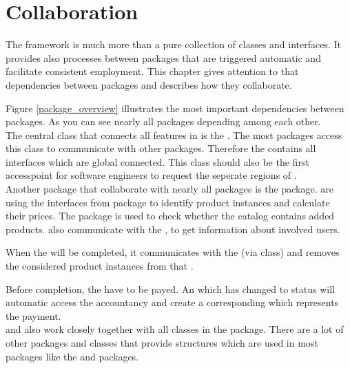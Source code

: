 \chapter{Collaboration}

The \salespoint{} framework is much more than a pure collection of classes and interfaces. It provides also processes between packages that are triggered automatic and facilitate consistent employment. This chapter gives attention to that dependencies between packages and describes how they collaborate.  

Figure \ref{package_overview} illustrates the most important dependencies between \salespoint{} packages. As you can see nearly all packages depending among each other.\\ 

The central class that connects all features in \salespoint{} is the . The most packages access this class to communicate with other packages. Therefore the  contains all interfaces which are global connected. This class should also be the first accesspoint for software engineers to request the seperate regions of \salespoint{}.\\

Another package that collaborate with nearly all packages is the  package.  are using the interfaces from  package to identify product instances and calculate their prices. The  package is used to check whether the catalog contains added products.  also communicate with the , to get information about involved users.\par 
When the  will be completed, it communicates with the  (via  class) and removes the considered product instances from that . \par
Before completion, the  have to be payed. An  which has changed to status  will automatic access the accountancy and create a corresponding  which represents the payment.\\ 

 and  also work closely together with all classes in the  package. There are a lot of other packages and classes that provide structures which are used in most packages like the  and  packages.




